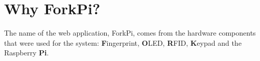 \section{Why ForkPi?}
The name of the web application, ForkPi, comes from the hardware components that were used for the system: \textbf{F}ingerprint, \textbf{O}LED, \textbf{R}FID, \textbf{K}eypad and the Raspberry \textbf{Pi}.